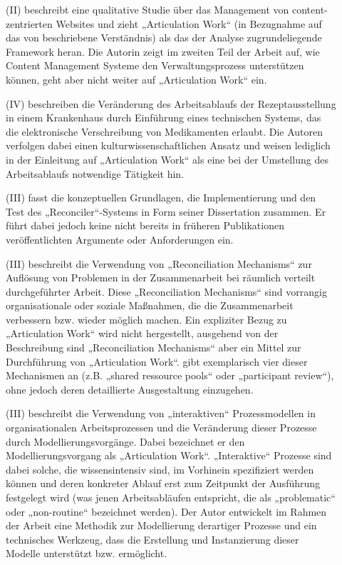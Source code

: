 \begin{description}
	\item[\citet{Eschenfelder03}] (II) beschreibt eine qualitative Studie über das Management von content-zentrierten Websites und zieht „Articulation Work“ (in Bezugnahme auf das von \citet{Corbin93} beschriebene Verständnis) als das der Analyse zugrundeliegende Framework heran. Die Autorin zeigt im zweiten Teil der Arbeit auf, wie Content Management Systeme den Verwaltungsprozess unterstützen können, geht aber nicht weiter auf „Articulation Work“ ein.
	\item[\citet{Olesen03}] (IV) beschreiben die Veränderung des Arbeitsablaufs der Rezeptausstellung in einem Krankenhaus durch Einführung eines technischen Systems, das die elektronische Verschreibung von Medikamenten erlaubt. Die Autoren verfolgen dabei einen kulturwissenschaftlichen Ansatz und weisen lediglich in der Einleitung auf „Articulation Work“ als eine bei der Umstellung des Arbeitsablaufs notwendige Tätigkeit hin.
	\item[\citet{Sarini03}] (III) fasst die konzeptuellen Grundlagen, die Implementierung und den Test des „Reconciler“-Systems in Form seiner Dissertation zusammen. Er führt dabei jedoch keine nicht bereits in früheren Publikationen veröffentlichten Argumente oder Anforderungen ein.
	\item[\citet{Gerson04}] (III) beschreibt die Verwendung von „Reconciliation Mechanisms“ zur Auflösung von Problemen in der Zusammenarbeit bei räumlich verteilt durchgeführter Arbeit. Diese „Reconciliation Mechanisms“ sind vorrangig organisationale oder soziale Maßnahmen, die die Zusammenarbeit verbessern bzw. wieder möglich machen. Ein expliziter Bezug zu „Articulation Work“ wird nicht hergestellt, ausgehend von der Beschreibung sind „Reconciliation Mechanisms“ aber ein Mittel zur Durchführung von „Articulation Work“. \citeauthor{Gerson04} gibt exemplarisch vier dieser Mechanismen an (z.B. „shared ressource pools“ oder „participant review“), ohne jedoch deren detaillierte Ausgestaltung einzugehen.
	\item[\citet{Jorgensen04}] (III) beschreibt die Verwendung von „interaktiven“ Prozessmodellen in organisationalen Arbeitsprozessen und die Veränderung dieser Prozesse durch Modellierungsvorgänge. Dabei bezeichnet er den Modellierungsvorgang als „Articulation Work“. „Interaktive“ Prozesse sind dabei solche, die wissensintensiv sind, im Vorhinein spezifiziert werden können und deren konkreter Ablauf erst zum Zeitpunkt der Ausführung festgelegt wird (was jenen Arbeitsabläufen entspricht, die als „problematic“ oder „non-routine“ bezeichnet werden). Der Autor entwickelt im Rahmen der Arbeit eine Methodik zur Modellierung derartiger Prozesse und ein technisches Werkzeug, dass die Erstellung und Instanzierung dieser Modelle unterstützt bzw. ermöglicht.

\end{description}
